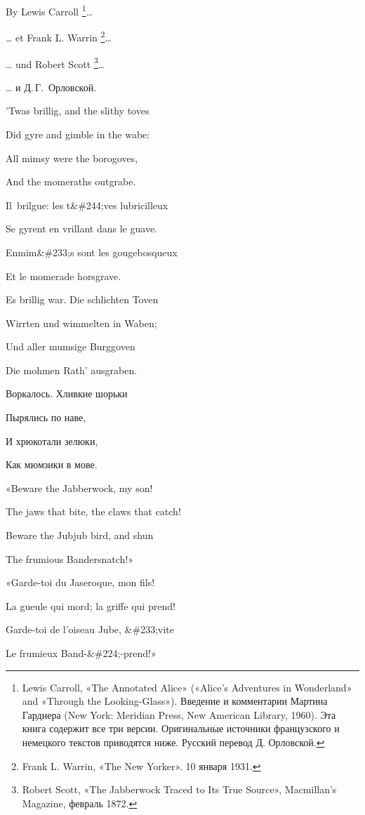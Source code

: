 \documentclass[../main.tex]{subfiles}
\begin{document}

By Lewis Carroll \footnote{Lewis Carroll, «The Annotated Alice» («Alice's Adventures in Wonderland» and «Through the Looking-Glass»). Введение и комментарии Мартина Гарднера (New York: Meridian Press, New American Library, 1960). Эта книга содержит все три версии. Оригинальные источники французского и немецкого текстов приводятся ниже. Русский перевод Д. Орловской.}\ldots{}

\ldots{} et Frank L. Warrin \footnote{Frank L. Warrin, «The New Yorker». 10 января 1931.}\ldots{}

\ldots{} und Robert Scott \footnote{Robert Scott, «The Jabberwock Traced to Its True Source», Macmillan's Magazine, февраль 1872.}\ldots{}

\ldots{} и Д.\,Г.~Орловской.

'Twas brillig, and the slithy toves

Did gyre and gimble in the wabe:

All mimsy were the borogoves,

And the momeraths outgrabe.

Il~brilgue: les t\&\#244;ves lubricilleux

Se gyrent en vrillant dans le guave.

Enmim\&\#233;s sont les gougebosqueux

Et le momerade horsgrave.

Es brillig war. Die schlichten Toven

Wirrten und wimmelten in Waben;

Und aller mumsige Burggoven

Die mohmen Rath' ausgraben.

Воркалось. Хливкие шорьки

Пырялись по наве,

И хрюкотали зелюки,

Как мюмзики в мове.

«Beware the Jabberwock, my son!

The jaws that bite, the claws that catch!

Beware the Jubjub bird, and shun

The frumious Bandersnatch!»

«Garde-toi du Jaseroque, mon fils!

La gueule qui mord; la griffe qui prend!

Garde-toi de l'oiseau Jube, \&\#233;vite

Le frumieux Band-\&\#224;-prend!»
\end{document}
